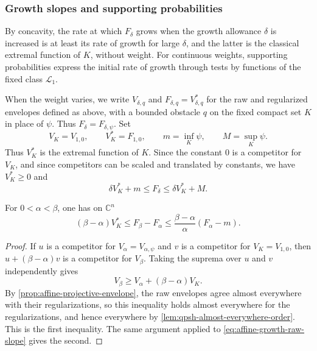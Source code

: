 \subsubsection{Growth slopes and supporting probabilities}
\label{sec:affine-envelope-slopes}

By concavity, the rate at which $F_\delta$ grows when the growth allowance $\delta$ is increased is at least its rate of growth for large $\delta$, and the latter is the classical extremal function of $K$, without weight. For continuous weights, supporting probabilities express the initial rate of growth through tests by functions of the fixed class $\mathcal L_1$.

When the weight varies, we write $V_{\delta,q}$ and $F_{\delta,q}=V_{\delta,q}^*$ for the raw and regularized envelopes defined as above, with a bounded obstacle $q$ on the fixed compact set $K$ in place of $\psi$. Thus $F_\delta=F_{\delta,\psi}$. Set
\[
 V_K=V_{1,0},\qquad V_K^*=F_{1,0},\qquad
 m=\inf_K\psi,\qquad M=\sup_K\psi.
\]
Thus $V_K^*$ is the extremal function of $K$. Since the constant $0$ is a competitor for $V_K$, and since competitors can be scaled and translated by constants, we have $V_K^*\geq0$ and
\begin{equation}\label{eq:affine-obstacle-sandwich}
 \delta V_K^*+m\leq F_\delta\leq\delta V_K^*+M.
\end{equation}

\begin{lemma}\label{lem:affine-growth-increment-bounds}
For $0<\alpha<\beta$, one has on $\mathbb C^n$
\begin{equation}\label{eq:affine-growth-increment-bounds}
 (\beta-\alpha)V_K^*\leq F_\beta-F_\alpha
 \leq\frac{\beta-\alpha}{\alpha}(F_\alpha-m).
\end{equation}
\end{lemma}
\begin{proof}
If $u$ is a competitor for $V_\alpha=V_{\alpha,\psi}$ and $v$ is a competitor for $V_K=V_{1,0}$, then $u+(\beta-\alpha)v$ is a competitor for $V_\beta$. Taking the suprema over $u$ and $v$ independently gives
\[
 V_\beta\geq V_\alpha+(\beta-\alpha)V_K.
\]
By \cref{prop:affine-projective-envelope}, the raw envelopes agree almost everywhere with their regularizations, so this inequality holds almost everywhere for the regularizations, and hence everywhere by \cref{lem:qpsh-almost-everywhere-order}. This is the first inequality. The same argument applied to \eqref{eq:affine-growth-raw-slope} gives the second.
\end{proof}

